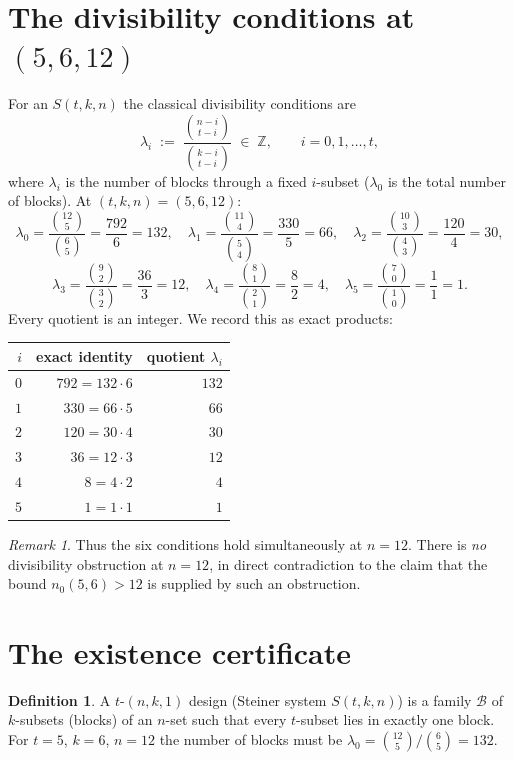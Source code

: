 \documentclass[11pt]{article}
\theoremstyle{definition}
\newtheorem{definition}[theorem]{Definition}
\theoremstyle{remark}
\newtheorem{remark}[theorem]{Remark}
\newcommand{\Z}{\mathbb{Z}}
\begin{document}
\section{The divisibility conditions at $(5,6,12)$}

For an $S(t,k,n)$ the classical divisibility conditions are
\[
  \lambda_i \;:=\; \frac{\binom{n-i}{t-i}}{\binom{k-i}{t-i}} \;\in\; \Z ,
  \qquad i = 0,1,\dots,t ,
\]
where $\lambda_i$ is the number of blocks through a fixed $i$-subset ($\lambda_0$
is the total number of blocks). At $(t,k,n) = (5,6,12)$:
\[
  \lambda_0 = \frac{\binom{12}{5}}{\binom{6}{5}} = \frac{792}{6} = 132,
  \quad
  \lambda_1 = \frac{\binom{11}{4}}{\binom{5}{4}} = \frac{330}{5} = 66,
  \quad
  \lambda_2 = \frac{\binom{10}{3}}{\binom{4}{3}} = \frac{120}{4} = 30,
\]
\[
  \lambda_3 = \frac{\binom{9}{2}}{\binom{3}{2}} = \frac{36}{3} = 12,
  \quad
  \lambda_4 = \frac{\binom{8}{1}}{\binom{2}{1}} = \frac{8}{2} = 4,
  \quad
  \lambda_5 = \frac{\binom{7}{0}}{\binom{1}{0}} = \frac{1}{1} = 1 .
\]
Every quotient is an integer. We record this as exact products:
\begin{center}
\begin{tabular}{r r r}
\toprule
$i$ & exact identity & quotient $\lambda_i$ \\
\midrule
$0$ & $792 = 132 \cdot 6$ & $132$ \\
$1$ & $330 = 66 \cdot 5$  & $66$  \\
$2$ & $120 = 30 \cdot 4$  & $30$  \\
$3$ & $36 = 12 \cdot 3$   & $12$  \\
$4$ & $8 = 4 \cdot 2$     & $4$   \\
$5$ & $1 = 1 \cdot 1$     & $1$   \\
\bottomrule
\end{tabular}
\end{center}

\begin{remark}
Thus the six conditions hold simultaneously at $n = 12$. There is \emph{no}
divisibility obstruction at $n = 12$, in direct contradiction to the claim that
the bound $n_0(5,6) > 12$ is supplied by such an obstruction.
\end{remark}

\section{The existence certificate}

\begin{definition}
A $t$-$(n,k,1)$ design (Steiner system $S(t,k,n)$) is a family $\mathcal{B}$ of
$k$-subsets (blocks) of an $n$-set such that every $t$-subset lies in exactly
one block. For $t=5$, $k=6$, $n=12$ the number of blocks must be
$\lambda_0 = \binom{12}{5}/\binom{6}{5} = 132$.
\end{definition}
\end{document}
